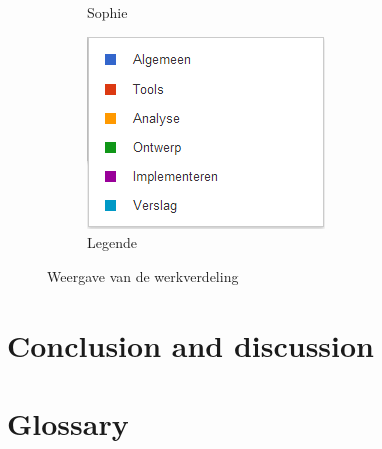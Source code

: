 \documentclass[i2]{oss}
\begin{document}
\begin{figure}[h!]
\begin{subfigure}[hb]{0.20\textwidth}
                \caption{Sophie}
        \end{subfigure}%
                \begin{subfigure}[hb]{0.20\textwidth}
                \centering
                \includegraphics[width=\textwidth]{legende}
                \caption{Legende}
        \end{subfigure}%


 \caption{Weergave van de werkverdeling}
\label{fig:werkverdeling}
\end{figure}





\section{Conclusion and discussion}
\label{ssec:conclusion}



\section{Glossary}
\label{ssec:glossary}
\end{document}
